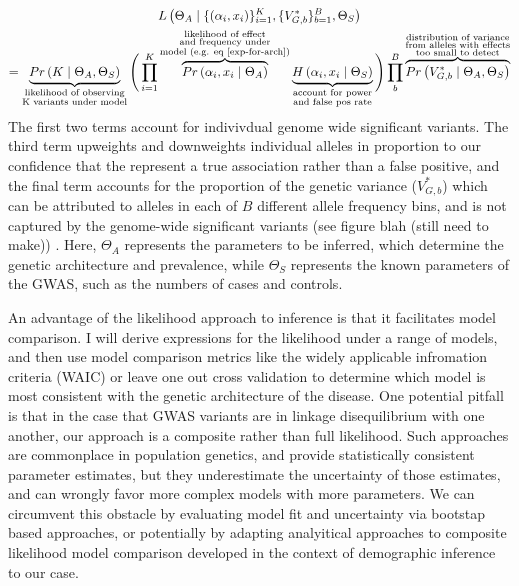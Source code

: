 \documentclass[11pt]{article}
\newcommand{\jb}[1]{{\color{blue} (#1)} }
\begin{document}
\begin{multline*}
  L\left(\Theta_A \mid \{\left(\alpha_i, x_i\right)\}_{i=1}^K , \{V^*_{G,b}\}_{b=1}^B, \Theta_S\right) \\ 
  = \underbrace{Pr\left(K \mid \Theta_A , \Theta_S \right)}_{\substack{\text{likelihood of observing} \\ \text{K variants under model}}} \Bigg( \prod_{i=1}^K \overbrace{Pr\left(\alpha_i , x_i \mid \Theta_A \right)}^{\substack{\text{likelihood of effect} \\ \text{and frequency under} \\ \text{model (e.g. eq \ref{exp-for-arch})}}} \underbrace{H\left(\alpha_i , x_i \mid \Theta_S\right)}_{\substack{\text{account for power} \\ \text{and false pos rate}}} \Bigg) \prod_b^B \overbrace{Pr\left(V^*_{G,b} \mid \Theta_A, \Theta_S \right)}^{\substack{\text{distribution of variance} \\ \text{from alleles with effects} \\ \text{too small to detect}}}
\end{multline*}
The first two terms account for indivivdual genome wide significant variants. The third term upweights and downweights individual alleles in proportion to our confidence that the represent a true association rather than a false positive, and the final term accounts for the proportion of the genetic variance ($V_{G,b}^*$) which can be attributed to alleles in each of $B$ different allele frequency bins, and is not captured by the genome-wide significant variants \jb{see figure blah (still need to make)}. Here, $\Theta_A$ represents the parameters to be inferred, which determine the genetic architecture and prevalence, while $\Theta_S$ represents the known parameters of the GWAS, such as the numbers of cases and controls. 

An advantage of the likelihood approach to inference is that it facilitates model comparison. I will derive expressions for the likelihood under a range of models, and then use model comparison metrics like the widely applicable infromation criteria (WAIC) or leave one out cross validation\cite{Vehtari:2016fm} to determine which model is most consistent with the genetic architecture of the disease. One potential pitfall is that in the case that GWAS variants are in linkage disequilibrium with one another, our approach is a composite rather than full likelihood. Such approaches are commonplace in population genetics, and provide statistically consistent parameter estimates\cite{Wiuf:2006bl}, but they underestimate the uncertainty of those estimates, and can wrongly favor more complex models with more parameters. We can circumvent this obstacle by evaluating model fit and uncertainty via bootstap based approaches, or potentially by adapting analyitical approaches to composite likelihood model comparison developed in the context of demographic inference to our case.  
\end{document}

